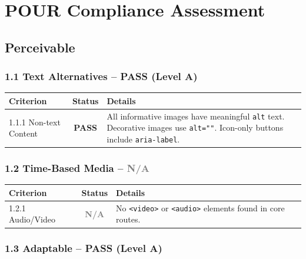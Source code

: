 \documentclass[12pt,a4paper]{article}
\newcommand{\pass}{\textcolor{passgreen}{\textbf{PASS}}}
\newcommand{\na}{\textcolor{gray}{\textbf{N/A}}}
\begin{document}
\section{POUR Compliance Assessment}

\subsection{Perceivable}

\subsubsection{1.1 Text Alternatives -- \pass{} (Level A)}

\begin{table}[H]
\centering
\begin{tabularx}{\textwidth}{lcX}
\toprule
\textbf{Criterion} & \textbf{Status} & \textbf{Details} \\
\midrule
1.1.1 Non-text Content & \pass & All informative images have meaningful \texttt{alt} text. Decorative images use \texttt{alt=""}. Icon-only buttons include \texttt{aria-label}. \\
\bottomrule
\end{tabularx}
\end{table}

\subsubsection{1.2 Time-Based Media -- \na}

\begin{table}[H]
\centering
\begin{tabularx}{\textwidth}{lcX}
\toprule
\textbf{Criterion} & \textbf{Status} & \textbf{Details} \\
\midrule
1.2.1 Audio/Video & \na & No \texttt{<video>} or \texttt{<audio>} elements found in core routes. \\
\bottomrule
\end{tabularx}
\end{table}

\subsubsection{1.3 Adaptable -- \pass{} (Level A)}
\end{document}
